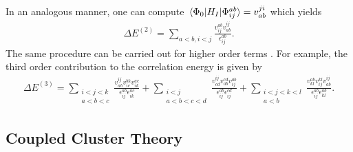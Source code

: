 \documentclass[Dual]{msu-thesis}
\begin{document}
In an analogous manner, one can compute $\mel*{\Phi_0}{H_I}{\Phi^{ab}_{ij}}=v^{ji}_{ab}$ which yields
\begin{align}
\label{final_delta_e2}
\Delta E^{(2)}=
\sum_{a<b,i<j}\frac{v^{ab}_{ij}v^{ij}_{ab}}{\epsilon^{ab}_{ij}}.
\end{align}
The same procedure can be carried out for higher order terms \cite{higher_terms}. For example, the third order contribution to the correlation energy is given by
\begin{align}
\label{final_delta_e3}
\Delta E^{(3)}
=
\sum_{\substack{i<j<k \\ a<b<c}}
\frac{v^{ij}_{ab}v^{bk}_{ic}v^{ac}_{ik}}{\epsilon^{ab}_{ij}\epsilon^{ac}_{ik}}
+
\sum_{\substack{i<j \\ a<b<c<d}}
\frac{v^{ij}_{cd}v^{cd}_{ab}v^{ab}_{ij}}{\epsilon^{ab}_{ij}\epsilon^{cd}_{ij}}
+
\sum_{\substack{i<j<k<l \\ a<b}}
\frac{v^{ab}_{kl}v^{kl}_{ij}v^{ij}_{ab}}{\epsilon^{ab}_{ij}\epsilon^{ab}_{kl}}.
\end{align}

\subsection{Coupled Cluster Theory}
\end{document}
